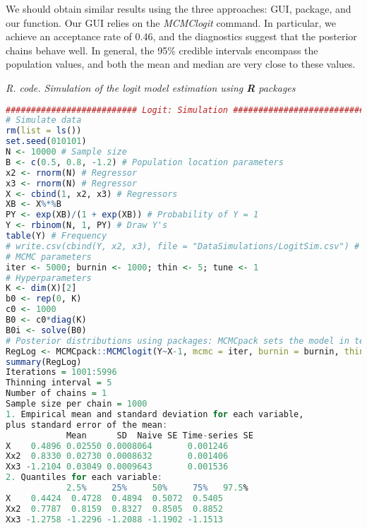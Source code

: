 We should obtain similar results using the three approaches: GUI, package, and our function. Our GUI relies on the \textit{MCMClogit} command. In particular, we achieve an acceptance rate of 0.46, and the diagnostics suggest that the posterior chains behave well. In general, the 95\% credible intervals encompass the population values, and both the mean and median are very close to these values.

\begin{tcolorbox}[enhanced,width=4.67in,center upper,
	fontupper=\large\bfseries,drop shadow southwest,sharp corners]
	\textit{R. code. Simulation of the logit model estimation using \textbf{R} packages}
	\begin{VF}
		\begin{lstlisting}[language=R]		
########################## Logit: Simulation ##########################
# Simulate data
rm(list = ls())
set.seed(010101)
N <- 10000 # Sample size
B <- c(0.5, 0.8, -1.2) # Population location parameters
x2 <- rnorm(N) # Regressor
x3 <- rnorm(N) # Regressor
X <- cbind(1, x2, x3) # Regressors
XB <- X%*%B
PY <- exp(XB)/(1 + exp(XB)) # Probability of Y = 1
Y <- rbinom(N, 1, PY) # Draw Y's
table(Y) # Frequency
# write.csv(cbind(Y, x2, x3), file = "DataSimulations/LogitSim.csv") # Export data
# MCMC parameters
iter <- 5000; burnin <- 1000; thin <- 5; tune <- 1
# Hyperparameters
K <- dim(X)[2] 
b0 <- rep(0, K)
c0 <- 1000
B0 <- c0*diag(K)
B0i <- solve(B0)
# Posterior distributions using packages: MCMCpack sets the model in terms of the precision matrix
RegLog <- MCMCpack::MCMClogit(Y~X-1, mcmc = iter, burnin = burnin, thin = thin, b0 = b0, B0 = B0i, tune = tune)
summary(RegLog)
Iterations = 1001:5996
Thinning interval = 5 
Number of chains = 1 
Sample size per chain = 1000 
1. Empirical mean and standard deviation for each variable,
plus standard error of the mean:
			Mean      SD  Naive SE Time-series SE
X    0.4896 0.02550 0.0008064       0.001246
Xx2  0.8330 0.02730 0.0008632       0.001406
Xx3 -1.2104 0.03049 0.0009643       0.001536
2. Quantiles for each variable:
			2.5%     25%     50%     75%   97.5%
X    0.4424  0.4728  0.4894  0.5072  0.5405
Xx2  0.7787  0.8159  0.8327  0.8505  0.8852
Xx3 -1.2758 -1.2296 -1.2088 -1.1902 -1.1513
\end{lstlisting}
	\end{VF}
\end{tcolorbox} 

